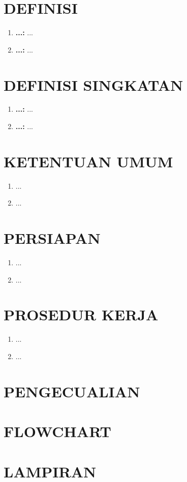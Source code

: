 \documentclass[12pt]{sop}
\begin{document}
    \section{DEFINISI}
    \begin{enumerate}
        \item \textbf{...:} ...
        \item \textbf{...:} ...
    \end{enumerate}

    \section{DEFINISI SINGKATAN}
    \begin{enumerate}
        \item \textbf{...:} ...
        \item \textbf{...:} ...
    \end{enumerate}

    \section{KETENTUAN UMUM}
    \begin{enumerate}
        \item ...
        \item ...
    \end{enumerate}

    \section{PERSIAPAN}
    \begin{enumerate}
        \item ...
        \item ...
    \end{enumerate}

    \section{PROSEDUR KERJA}
    \begin{enumerate}
        \item ...
        \item ...
    \end{enumerate}

    \section{PENGECUALIAN}
    \section{FLOWCHART}
    \section{LAMPIRAN}
\end{document}
